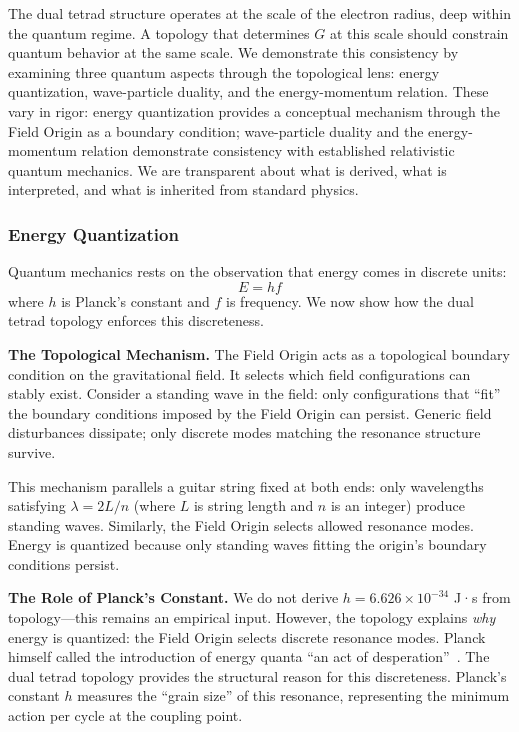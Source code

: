 \documentclass[aps,prd,preprint,superscriptaddress,showpacs,preprintnumbers,amsmath,amssymb,nofootinbib]{revtex4-2}
\begin{document}
The dual tetrad structure operates at the scale of the electron radius, deep within the quantum regime. A topology that determines $G$ at this scale should constrain quantum behavior at the same scale. We demonstrate this consistency by examining three quantum aspects through the topological lens: energy quantization, wave-particle duality, and the energy-momentum relation. These vary in rigor: energy quantization provides a conceptual mechanism through the Field Origin as a boundary condition; wave-particle duality and the energy-momentum relation demonstrate consistency with established relativistic quantum mechanics. We are transparent about what is derived, what is interpreted, and what is inherited from standard physics.

\subsubsection*{Energy Quantization}

Quantum mechanics rests on the observation that energy comes in discrete units:
\begin{equation}
E = hf
\label{eq:energy_quantization}
\end{equation}
where $h$ is Planck's constant and $f$ is frequency. We now show how the dual tetrad topology enforces this discreteness.

\textbf{The Topological Mechanism.}
The Field Origin acts as a topological boundary condition on the gravitational field. It selects which field configurations can stably exist. Consider a standing wave in the field: only configurations that ``fit'' the boundary conditions imposed by the Field Origin can persist. Generic field disturbances dissipate; only discrete modes matching the resonance structure survive.

This mechanism parallels a guitar string fixed at both ends: only wavelengths satisfying $\lambda = 2L/n$ (where $L$ is string length and $n$ is an integer) produce standing waves. Similarly, the Field Origin selects allowed resonance modes. Energy is quantized because only standing waves fitting the origin's boundary conditions persist.

\textbf{The Role of Planck's Constant.}
We do not derive $h = 6.626 \times 10^{-34}$ J·s from topology—this remains an empirical input. However, the topology explains \emph{why} energy is quantized: the Field Origin selects discrete resonance modes. Planck himself called the introduction of energy quanta ``an act of desperation''~\cite{planck1931}. The dual tetrad topology provides the structural reason for this discreteness. Planck's constant $h$ measures the ``grain size'' of this resonance, representing the minimum action per cycle at the coupling point.
\end{document}
